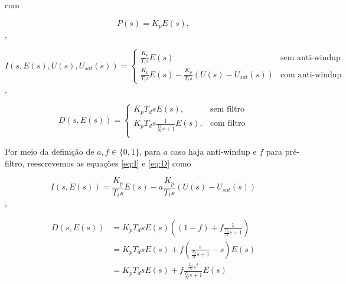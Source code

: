 \documentclass[twoside, fleqn]{article}
\begin{document}
    com 
    
        \begin{equation}
            P(s) = K_p E(s),
            \label{eq:P}
        \end{equation},
    
        \begin{equation}
            I(s, E(s), U(s), U_{sat}(s)) = \begin{cases}
            \frac{K_p}{T_i s} E(s) & \mbox{sem anti-windup} \\
            \frac{K_p}{T_i s} E(s) - \frac{K_p}{T_t s} \left(U(s) - U_{sat}(s)\right)& \mbox{com anti-windup}
            \end{cases}
            \label{eq:I}
        \end{equation},
    
        \begin{equation}
            D(s, E(s)) = 
            \begin{cases}
                K_p T_d s E(s), & \mbox{sem filtro} \\
                K_p T_d s \frac{1}{\frac{T_d}{N}s + 1} E(s), & \mbox{com filtro} \\
            \end{cases}
            \label{eq:D}
        \end{equation}
    
    Por meio da definição de $a, f \in \{0, 1\}$, para $a$ caso haja anti-windup e $f$ para pré-filtro, reescrevemos as equações \eqref{eq:I} e \eqref{eq:D} como
    
        \begin{equation}
            I(s, E(s)) =  \frac{K_p}{T_i s} E(s) - a \frac{K_p}{T_t s} \left( U(s) - U_{sat}(s)\right)
            \label{eq:Ia}
        \end{equation},
    
        \begin{equation}
            \begin{split}
                D(s, E(s)) &= K_p T_d s E(s) \left((1-f) + f \frac{1}{\frac{T_d}{N}s + 1}\right) \\
                & = K_p T_d s E(s) + f \left(\frac{s}{\frac{T_d}{N} s + 1}  - s\right) E(s) \\
                & = K_p T_d s E(s) + f \frac{\frac{T_d}{N} s^2}{\frac{T_d}{N}s + 1} E(s)
            \end{split}
            \label{eq:Df}
        \end{equation}
    
\end{document}
